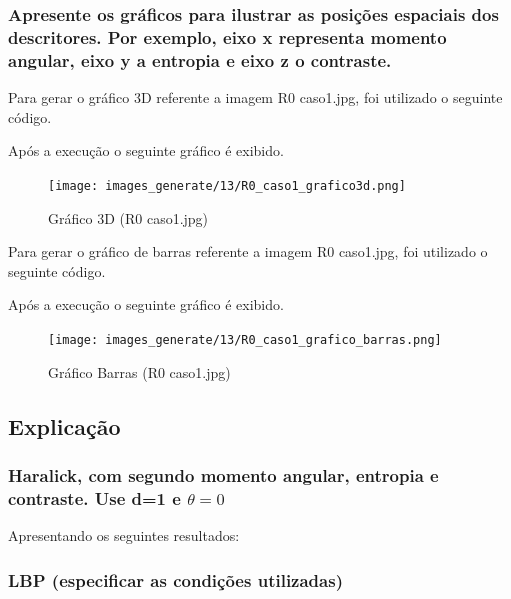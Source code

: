 \documentclass[10pt,a4paper]{article}
\begin{document}


\subsubsection{Apresente os gráficos para ilustrar as posições espaciais dos descritores. Por exemplo, eixo x representa momento angular, eixo y a entropia e eixo z o contraste.}

Para gerar o gráfico 3D referente a imagem R0 \textunderscore caso1.jpg, foi utilizado o seguinte código.



Após a execução o seguinte gráfico é exibido.

\begin{figure}[H]
    \centering
    \texttt{[image: images\_generate/13/R0\_caso1\_grafico3d.png]}
    \caption{Gráfico 3D (R0 \textunderscore caso1.jpg) }
\end{figure}

Para gerar o gráfico de barras referente a imagem R0 \textunderscore caso1.jpg, foi utilizado o seguinte código.



Após a execução o seguinte gráfico é exibido.

\begin{figure}[H]
    \centering
    \texttt{[image: images\_generate/13/R0\_caso1\_grafico\_barras.png]}
    \caption{Gráfico Barras (R0 \textunderscore caso1.jpg) }
\end{figure}

\subsection{Explicação}

\subsubsection{Haralick, com segundo momento angular, entropia e contraste. Use d=1 e  $\theta=0$}

\begin{flushleft}
Apresentando os seguintes resultados:
\end{flushleft}



\subsubsection{LBP (especificar as condições utilizadas)}
\end{document}
